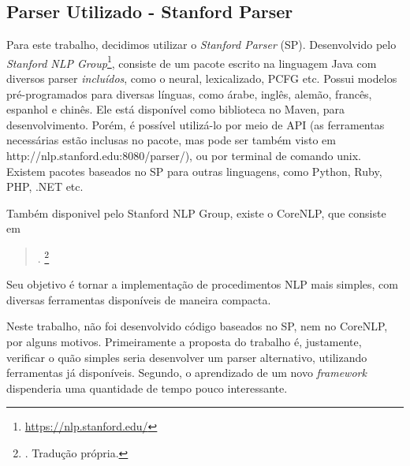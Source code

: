 \subsection{Parser Utilizado - Stanford Parser}
\label{sec:stanfordParser}
Para este trabalho, decidimos utilizar o \textit{Stanford Parser} (SP). Desenvolvido pelo \textit{Stanford NLP Group}\footnote{\url{https://nlp.stanford.edu/}}, consiste de um pacote escrito na linguagem Java com diversos parser \textit{incluídos}, como o neural, lexicalizado, PCFG etc. Possui modelos pré-programados para diversas línguas, como árabe, inglês, alemão, francês, espanhol e chinês. Ele está disponível como biblioteca no Maven, para desenvolvimento. Porém, é possível utilizá-lo por meio de API (as ferramentas necessárias estão inclusas no pacote, mas pode ser também visto em http://nlp.stanford.edu:8080/parser/), ou por terminal de comando unix. Existem pacotes baseados no SP para outras linguagens, como Python, Ruby, PHP, .NET etc.

Também disponivel pelo Stanford NLP Group, existe o CoreNLP, que consiste em  
\begin{quote}
    .
    \footnote{. Tradução própria.}
\end{quote}
Seu objetivo é tornar a implementação de procedimentos NLP mais simples, com diversas ferramentas disponíveis de maneira compacta.

Neste trabalho, não foi desenvolvido código baseados no SP, nem no CoreNLP, por alguns motivos. Primeiramente a proposta do trabalho é, justamente, verificar o quão simples seria desenvolver um parser alternativo, utilizando ferramentas já disponíveis. Segundo, o aprendizado de um novo \textit{framework} dispenderia uma quantidade de tempo pouco interessante.

